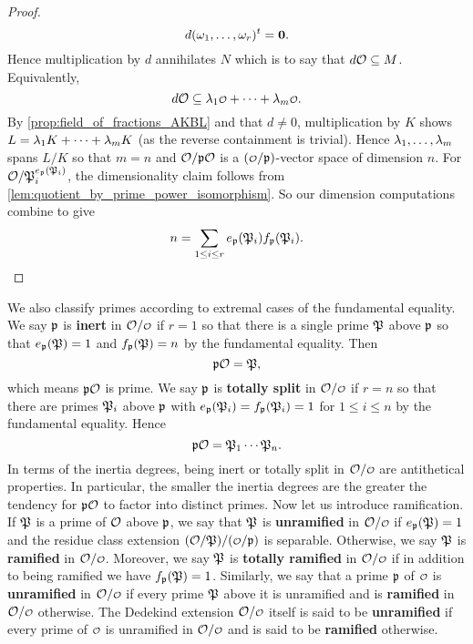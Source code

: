 \begin{proof}
      \[
        d(\omega_{1},\ldots,\omega_{r})^{t} = \mathbf{0}.
      \]
      Hence multiplication by $d$ annihilates $N$ which is to say that $d\mathcal{O} \subseteq M$. Equivalently,
      \[
        d\mc{O} \subseteq \l_{1}\smc{O}+\cdots+\l_{m}\smc{O}.
      \]
      By \cref{prop:field_of_fractions_AKBL} and that $d \neq 0$, multiplication by $K$ shows $L = \lambda_{1}K+\cdots+\lambda_{m}K$ (as the reverse containment is trivial). Hence $\lambda_{1},\ldots,\lambda_{m}$ spans $L/K$ so that $m = n$ and $\mathcal{O}/\mathfrak{p}\mathcal{O}$ is a $(\smc{O}/\mf{p})$-vector space of dimension $n$. For $\mathcal{O}/\mathfrak{P}_{i}^{e_{\mathfrak{p}}(\mathfrak{P}_{i})}$, the dimensionality claim follows from \cref{lem:quotient_by_prime_power_isomorphism}. So our dimension computations combine to give
      \[
        n = \sum_{1 \le i \le r}e_{\mathfrak{p}}(\mathfrak{P}_{i})f_{\mathfrak{p}}(\mathfrak{P}_{i}).
      \]
    \end{proof}

    We also classify primes according to extremal cases of the fundamental equality. We say $\mathfrak{p}$ is \textbf{inert} in $\mc{O}/\smc{O}$ if $r = 1$ so that there is a single prime $\mathfrak{P}$ above $\mathfrak{p}$ so that $e_{\mathfrak{p}}(\mathfrak{P}) = 1$ and $f_{\mathfrak{p}}(\mathfrak{P}) = n$ by the fundamental equality. Then
    \[
      \mathfrak{p}\mathcal{O} = \mathfrak{P},
    \]
    which means $\mathfrak{p}\mathcal{O}$ is prime. We say $\mathfrak{p}$ is \textbf{totally split} in $\mc{O}/\smc{O}$ if $r = n$ so that there are primes $\mathfrak{P}_{i}$ above $\mathfrak{p}$ with $e_{\mathfrak{p}}(\mathfrak{P}_{i}) = f_{\mathfrak{p}}(\mathfrak{P}_{i}) = 1$ for $1 \le i \le n$ by the fundamental equality. Hence
    \[
      \mathfrak{p}\mathcal{O} = \mathfrak{P}_{1} \cdots \mathfrak{P}_{n}.
    \]
    In terms of the inertia degrees, being inert or totally split in $\mc{O}/\smc{O}$ are antithetical properties. In particular, the smaller the inertia degrees are the greater the tendency for $\mathfrak{p}\mathcal{O}$ to factor into distinct primes. Now let us introduce ramification. If $\mathfrak{P}$ is a prime of $\mathcal{O}$ above $\mathfrak{p}$, we say that $\mathfrak{P}$ is \textbf{unramified} in $\mc{O}/\smc{O}$ if $e_{\mathfrak{p}}(\mathfrak{P}) = 1$ and the residue class extension $(\mc{O}/\mf{P})/(\smc{O}/\mf{p})$ is separable. Otherwise, we say $\mathfrak{P}$ is \textbf{ramified} in $\mc{O}/\smc{O}$. Moreover, we say $\mathfrak{P}$ is \textbf{totally ramified} in $\mc{O}/\smc{O}$ if in addition to being ramified we have $f_{\mathfrak{p}}(\mathfrak{P}) = 1$. Similarly, we say that a prime $\mathfrak{p}$ of $\smc{O}$ is \textbf{unramified} in $\mc{O}/\smc{O}$ if every prime $\mathfrak{P}$ above it is unramified and is \textbf{ramified} in $\mc{O}/\smc{O}$ otherwise. The Dedekind extension $\mc{O}/\smc{O}$ itself is said to be \textbf{unramified} if every prime of $\smc{O}$ is unramified in $\mc{O}/\smc{O}$ and is said to be \textbf{ramified} otherwise.

